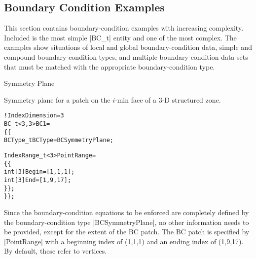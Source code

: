 \subsection{Boundary Condition Examples}  
\label{s:BCexample}

This section contains boundary-condition examples with increasing
complexity.  Included is the most simple |BC_t| entity and one of
the most complex.  The examples show situations of local and global
boundary-condition data, simple and compound boundary-condition types,
and multiple boundary-condition data sets that must be matched with the
appropriate boundary-condition type.

\begin{example}{Symmetry Plane}
\label{ex:bc1}

Symmetry plane for a patch on the $i$-min face of a 3-D structured zone.  
\begin{alltt}
  !  IndexDimension = 3
  BC\_t<3,3> BC1 =
    \{\{
    BCType\_t BCType = BCSymmetryPlane ;

    IndexRange\_t<3> PointRange =
      \{\{
      int[3] Begin = [1,1,1 ] ;
      int[3] End   = [1,9,17] ;
      \}\} ;
    \}\} ;
\end{alltt}
Since the boundary-condition equations to be enforced are completely
defined by the boundary-condition type |BCSymmetryPlane|, no other
information needs to be provided, except for the extent of the BC patch.
The BC patch is specified by |PointRange| with a beginning index of
(1,1,1) and an ending index of (1,9,17).
By default, these refer to vertices.
\end{example}


